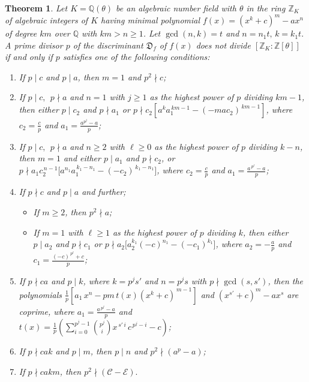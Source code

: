 \documentclass[table]{amsart}
\newtheorem{theorem}{Theorem}[section]
\newcommand{\Z}{\mathbb{Z}}
\newcommand{\D}{\mathfrak{D}}
\newcommand{\calC}{\mathcal{C}}
\newcommand{\calE}{\mathcal{E}}
\numberwithin{equation}{section}
\begin{document}
\begin{theorem} \label{monogeneity of f(x)}
	Let $K=\mathbb Q(\theta)$ be an algebraic number field with $\theta$ in the ring $\Z_K$ of algebraic integers of $K$ having  minimal polynomial   $f(x) = (x^k+c)^m-ax^n$ of degree $km$ over $\mathbb Q$ with   $km>n\geq{1}$. Let $\gcd(n,k) = t$ and $n = n_1t,\, k = k_1t.$ A prime divisor $p$ of the discriminant  $\D_f$ of $f(x)$ does not divide $[\Z_{K} : \Z[\theta]]$ if and only if $p$  satisfies one of the following conditions: 
	 \begin{enumerate}[label=\textup{(\roman{enumi})}]
    \item  If $p\mid c$  and $p\mid a$, then $m=1$ and $p^2\nmid c$;
    \item  If $p\mid c,~~p\nmid a$ and $n=1$  with $j\geq 1$ as the highest power of $p$ dividing $km-1$, then either $p\mid c_2$ and $p\nmid a_1$ or $p\nmid c_2[a^ka_1^{\,km-1}-(-mac_2)^{\,km-1}]$, where $c_2=\frac{c}{p}$ and $a_1=\frac{a^{p^j}-a}{p}$;
    \item  If $p\mid c,~~p\nmid a$ and $n\geq 2$ with $\ell\geq 0$ as the highest power of $p$ dividing $k-n$, then $m=1$ and  either
$p\mid a_{1}$ and $p\nmid c_{2}$, or $p\nmid a_{1}c_{2}^{\,n-1}
\bigl[a^{n_1}a_{1}^{\,k_1-n_1}-(-c_{2})^{\,k_1-n_1}\bigr]$, where $c_2=\frac{c}{p}$ and $a_1=\frac{a^{\,p^{\ell}}-a}{p}$;
    \item  If $p\nmid c$ and $p\mid a$ and further;
    \begin{itemize}
        \item[\textup{(a)}] If $m\geq 2$, then $p^2\nmid a$;
        \item [\textup{(b)}] If $m=1$ with $\ell\geq 1$ as the highest power of $p$ dividing $k$, then either $p\mid a_2$ and $p\nmid c_1$ or $p\nmid a_2\bigl[a_{2}^{k_{1}}(-c)^{n_{1}}-(-c_{1})^{k_{1}}\bigr]$, where $a_2=-\frac{a}{p}$ and $c_1=\frac{(-c)^{\,p^{\ell}}+c}{p}$;
    \end{itemize}
    \item If $p \nmid ca$ and $p \mid k$, where $k = p^{j}s'$ and $n = p^{j}s$ with 
$p \nmid \gcd(s,s')$, then the polynomials $\frac{1}{p}[a_1\,x^{n} - p m\, t(x)(x^{k} + c)^{\,m-1}]$ and $(x^{s'} + c)^m - a x^s$ are coprime, where $a_1=\frac{a^{\,p^{j}}-a}{p}$ and\\ $t(x) = \frac{1}{p} \left( \sum_{i=0}^{p^{j}-1} \binom{p^{j}}{i} x^{\,s' \,i} \,c^{\,p^{j}-i} - c \right)$;
     \item If $p\nmid cak$ and $p\mid m$, then $p \mid n$ and $p^2\nmid (a^{p}-a)$;
    \item  If $p\nmid cakm$, then $p^2\nmid (\calC-\calE).$
	\end{enumerate}
\end{theorem}    
\end{document}
